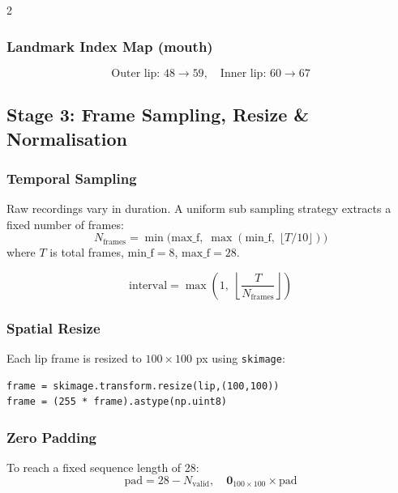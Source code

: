 \documentclass[10pt, a4paper]{article}
\begin{document}
\begin{multicols}{2}
\subsubsection{Landmark Index Map (mouth)}
\begin{equation}
\text{Outer lip: } 48 \to 59, \quad \text{Inner lip: } 60 \to 67
\end{equation}

\subsection{Stage 3: Frame Sampling, Resize \& Normalisation}

\subsubsection{Temporal Sampling}
Raw recordings vary in duration. A uniform sub sampling strategy
extracts a fixed number of frames:
\begin{equation}
N_{\text{frames}} = \min\!\bigl(\text{max\_f},\; \max(\text{min\_f},\;
  \lfloor T / 10 \rfloor)\bigr)
\end{equation}
where $T$ is total frames, $\text{min\_f} = 8$, $\text{max\_f} = 28$.

\begin{equation}
\text{interval} = \max\!\left(1,\; \left\lfloor \frac{T}{N_{\text{frames}}} \right\rfloor\right)
\end{equation}

\subsubsection{Spatial Resize}
Each lip frame is resized to $100 \times 100$ px using \texttt{skimage}:
\begin{codebox}
\footnotesize
\begin{verbatim}
frame = skimage.transform.resize(lip,(100,100))
frame = (255 * frame).astype(np.uint8)
\end{verbatim}
\end{codebox}

\subsubsection{Zero Padding}
To reach a fixed sequence length of 28:
\begin{equation}
\text{pad} = 28 - N_{\text{valid}}, \quad
\mathbf{0}_{100 \times 100} \times \text{pad}
\end{equation}


\end{multicols}
\end{document}
